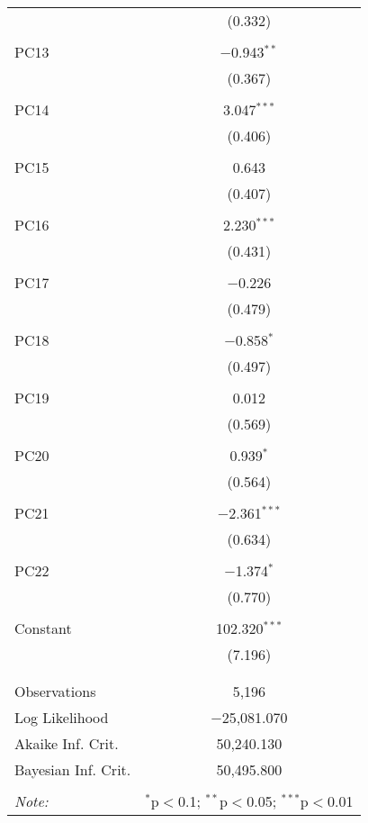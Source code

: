 \begin{table}[!htbp]
\begin{tabular}{@{\extracolsep{5pt}}lc}
  & (0.332) \\ 
  & \\ 
 PC13 & $-$0.943$^{**}$ \\ 
  & (0.367) \\ 
  & \\ 
 PC14 & 3.047$^{***}$ \\ 
  & (0.406) \\ 
  & \\ 
 PC15 & 0.643 \\ 
  & (0.407) \\ 
  & \\ 
 PC16 & 2.230$^{***}$ \\ 
  & (0.431) \\ 
  & \\ 
 PC17 & $-$0.226 \\ 
  & (0.479) \\ 
  & \\ 
 PC18 & $-$0.858$^{*}$ \\ 
  & (0.497) \\ 
  & \\ 
 PC19 & 0.012 \\ 
  & (0.569) \\ 
  & \\ 
 PC20 & 0.939$^{*}$ \\ 
  & (0.564) \\ 
  & \\ 
 PC21 & $-$2.361$^{***}$ \\ 
  & (0.634) \\ 
  & \\ 
 PC22 & $-$1.374$^{*}$ \\ 
  & (0.770) \\ 
  & \\ 
 Constant & 102.320$^{***}$ \\ 
  & (7.196) \\ 
  & \\ 
\hline \\[-1.8ex] 
Observations & 5,196 \\ 
Log Likelihood & $-$25,081.070 \\ 
Akaike Inf. Crit. & 50,240.130 \\ 
Bayesian Inf. Crit. & 50,495.800 \\ 
\hline 
\hline \\[-1.8ex] 
\textit{Note:}  & \multicolumn{1}{r}{$^{*}$p$<$0.1; $^{**}$p$<$0.05; $^{***}$p$<$0.01} \\ 
\end{tabular} 
\end{table} 
